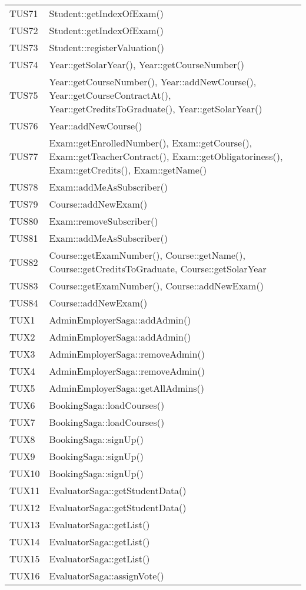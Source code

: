 \documentclass[PianoDiQualifica.tex]{subfiles}
\begin{document}
\begin{longtable}[H]{P{5cm}P{9cm}}
	TUS71 & Student::getIndexOfExam()\\
	TUS72 & Student::getIndexOfExam()\\
	TUS73 & Student::registerValuation()\\
	TUS74 & Year::getSolarYear(), Year::getCourseNumber()\\
	TUS75 & Year::getCourseNumber(), Year::addNewCourse(), Year::getCourseContractAt(), Year::getCreditsToGraduate(), Year::getSolarYear() \\
	TUS76 & Year::addNewCourse()\\
	TUS77 & Exam::getEnrolledNumber(), Exam::getCourse(), Exam::getTeacherContract(), Exam::getObligatoriness(), Exam::getCredits(), Exam::getName()\\
	TUS78 & Exam::addMeAsSubscriber()\\
	TUS79 & Course::addNewExam()\\
	TUS80 & Exam::removeSubscriber()\\
	TUS81 & Exam::addMeAsSubscriber()\\
	TUS82 & Course::getExamNumber(), Course::getName(), Course::getCreditsToGraduate, Course::getSolarYear\\
	TUS83 & Course::getExamNumber(), Course::addNewExam()\\
	TUS84 & Course::addNewExam()\\
	\hhline
	\hhline
	TUX1 & AdminEmployerSaga::addAdmin() \\
	TUX2 & AdminEmployerSaga::addAdmin() \\
	TUX3 & AdminEmployerSaga::removeAdmin() \\
	TUX4 & AdminEmployerSaga::removeAdmin() \\
	TUX5 & AdminEmployerSaga::getAllAdmins() \\
	TUX6 & BookingSaga::loadCourses() \\
	TUX7 & BookingSaga::loadCourses() \\
	TUX8 & BookingSaga::signUp() \\
	TUX9 & BookingSaga::signUp() \\
	TUX10 & BookingSaga::signUp() \\
	TUX11 & EvaluatorSaga::getStudentData() \\
	TUX12 & EvaluatorSaga::getStudentData() \\
	TUX13 & EvaluatorSaga::getList() \\
	TUX14 & EvaluatorSaga::getList() \\
	TUX15 & EvaluatorSaga::getList() \\
	TUX16 & EvaluatorSaga::assignVote() \\

\end{longtable}
\end{document}
